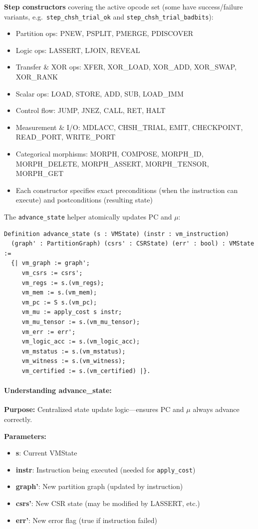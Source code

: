 \textbf{Step constructors} covering the active opcode set (some have success/failure variants, e.g.\ \texttt{step\_chsh\_trial\_ok} and \texttt{step\_chsh\_trial\_badbits}):
\begin{itemize}
    \item Partition ops: PNEW, PSPLIT, PMERGE, PDISCOVER
    \item Logic ops: LASSERT, LJOIN, REVEAL
    \item Transfer \& XOR ops: XFER, XOR\_LOAD, XOR\_ADD, XOR\_SWAP, XOR\_RANK
    \item Scalar ops: LOAD, STORE, ADD, SUB, LOAD\_IMM
    \item Control flow: JUMP, JNEZ, CALL, RET, HALT
    \item Measurement \& I/O: MDLACC, CHSH\_TRIAL, EMIT, CHECKPOINT, READ\_PORT, WRITE\_PORT
    \item Categorical morphisms: MORPH, COMPOSE, MORPH\_ID, MORPH\_DELETE, MORPH\_ASSERT, MORPH\_TENSOR, MORPH\_GET
    \item Each constructor specifies exact preconditions (when the instruction can execute) and postconditions (resulting state)
\end{itemize}

The \texttt{advance\_state} helper atomically updates PC and $\mu$:
\begin{lstlisting}
Definition advance_state (s : VMState) (instr : vm_instruction)
  (graph' : PartitionGraph) (csrs' : CSRState) (err' : bool) : VMState :=
  {| vm_graph := graph';
     vm_csrs := csrs';
     vm_regs := s.(vm_regs);
     vm_mem := s.(vm_mem);
     vm_pc := S s.(vm_pc);
     vm_mu := apply_cost s instr;
     vm_mu_tensor := s.(vm_mu_tensor);
     vm_err := err';
     vm_logic_acc := s.(vm_logic_acc);
     vm_mstatus := s.(vm_mstatus);
     vm_witness := s.(vm_witness);
     vm_certified := s.(vm_certified) |}.
\end{lstlisting}

\paragraph{Understanding advance\_state:}
\textbf{Purpose:} Centralized state update logic—ensures PC and $\mu$ always advance correctly.

\textbf{Parameters:}
\begin{itemize}
    \item \textbf{s}: Current VMState
    \item \textbf{instr}: Instruction being executed (needed for \texttt{apply\_cost})
    \item \textbf{graph'}: New partition graph (updated by instruction)
    \item \textbf{csrs'}: New CSR state (may be modified by LASSERT, etc.)
    \item \textbf{err'}: New error flag (true if instruction failed)
\end{itemize}

